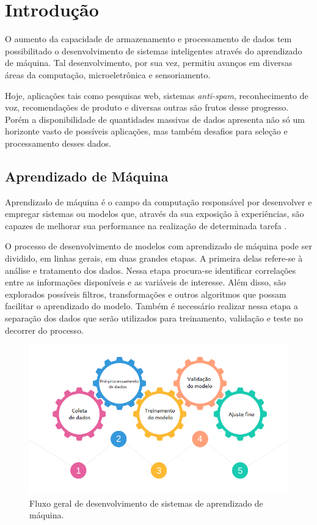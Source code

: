 \chapter[Introdução]{Introdução}

O aumento da capacidade de armazenamento e processamento de dados tem possibilitado o desenvolvimento de sistemas inteligentes através do aprendizado de máquina. Tal desenvolvimento, por sua vez, permitiu avanços em diversas áreas da computação, microeletrônica e sensoriamento. 

Hoje, aplicações tais como pesquisas web, sistemas \textit{anti-spam}, reconhecimento de voz, recomendações de produto e diversas outras são frutos desse progresso. Porém a disponibilidade de quantidades massivas de dados apresenta não só um horizonte vasto de possíveis aplicações, mas também desafios para seleção e processamento desses dados.


\section{Aprendizado de Máquina}

Aprendizado de máquina é o campo da computação responsável por desenvolver e empregar sistemas ou modelos que, através da sua exposição à experiências, são capazes de melhorar sua performance na realização de determinada tarefa \cite{mitchell_1997}.

O processo de desenvolvimento de modelos com aprendizado de máquina pode ser dividido, em linhas gerais, em duas grandes etapas. A primeira delas refere-se à análise e tratamento dos dados. Nessa etapa procura-se identificar correlações entre as informações disponíveis e as variáveis de interesse. Além disso, são explorados possíveis filtros, transformações e outros algoritmos que possam facilitar o aprendizado do modelo. Também é necessário realizar nessa etapa a separação dos dados que serão utilizados para treinamento, validação e teste no decorrer do processo.

\begin{figure}[!htb]
    \caption{Fluxo geral de desenvolvimento de sistemas de aprendizado de máquina.}
    \begin{center}
    \includegraphics[width=\linewidth]{imgs/intro/MLFlow}
    \end{center}
    \label{fig:mlflow}
\end{figure}

